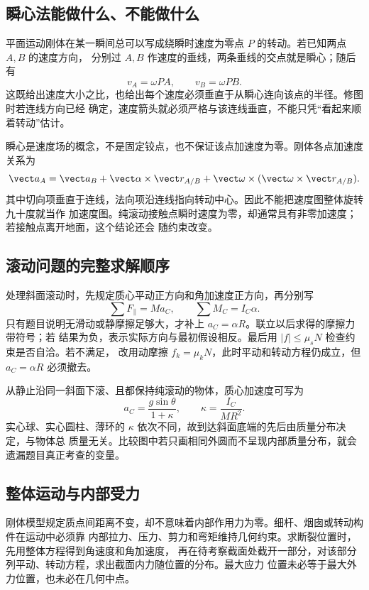 \subsection*{瞬心法能做什么、不能做什么}

平面运动刚体在某一瞬间总可以写成绕瞬时速度为零点 $P$ 的转动。若已知两点 $A,B$ 的速度方向，
分别过 $A,B$ 作速度的垂线，两条垂线的交点就是瞬心；随后有
\[
 v_A=\omega PA,\qquad v_B=\omega PB.
\]
这既给出速度大小之比，也给出每个速度必须垂直于从瞬心连向该点的半径。修图时若连线方向已经
确定，速度箭头就必须严格与该连线垂直，不能只凭“看起来顺着转动”估计。

瞬心是速度场的概念，不是固定铰点，也不保证该点加速度为零。刚体各点加速度关系为
\[
 \vect a_A=\vect a_B+\vect\alpha\times\vect r_{A/B}
 +\vect\omega\times(\vect\omega\times\vect r_{A/B}).
\]
其中切向项垂直于连线，法向项沿连线指向转动中心。因此不能把速度图整体旋转九十度就当作
加速度图。纯滚动接触点瞬时速度为零，却通常具有非零加速度；若接触点离开地面，这个结论还会
随约束改变。

\subsection*{滚动问题的完整求解顺序}

处理斜面滚动时，先规定质心平动正方向和角加速度正方向，再分别写
\[
 \sum F_\parallel=Ma_C,\qquad \sum M_C=I_C\alpha.
\]
只有题目说明无滑动或静摩擦足够大，才补上 $a_C=\alpha R$。联立以后求得的摩擦力带符号；若
结果为负，表示实际方向与最初假设相反。最后用 $|f|\le\mu_sN$ 检查约束是否自洽。若不满足，
改用动摩擦 $f_k=\mu_kN$，此时平动和转动方程仍成立，但 $a_C=\alpha R$ 必须撤去。

从静止沿同一斜面下滚、且都保持纯滚动的物体，质心加速度可写为
\[
 a_C=\frac{g\sin\theta}{1+\kappa},\qquad
 \kappa=\frac{I_C}{MR^2}.
\]
实心球、实心圆柱、薄环的 $\kappa$ 依次不同，故到达斜面底端的先后由质量分布决定，与物体总
质量无关。比较图中若只画相同外圆而不呈现内部质量分布，就会遗漏题目真正考查的变量。

\subsection*{整体运动与内部受力}

刚体模型规定质点间距离不变，却不意味着内部作用力为零。细杆、烟囱或转动构件在运动中必须靠
内部拉力、压力、剪力和弯矩维持几何约束。求断裂位置时，先用整体方程得到角速度和角加速度，
再在待考察截面处截开一部分，对该部分列平动、转动方程，求出截面内力随位置的分布。最大应力
位置未必等于最大外力位置，也未必在几何中点。

